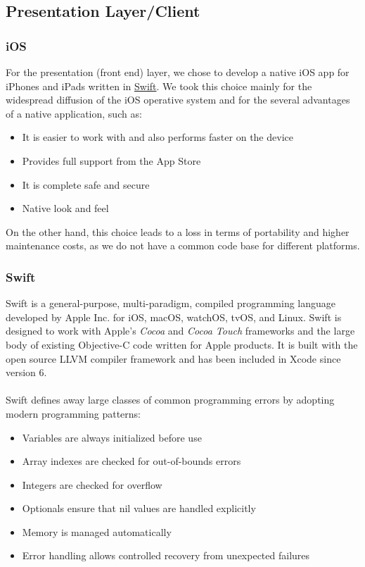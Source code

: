 \subsection{Presentation Layer/Client}

\subsubsection{iOS}
For the presentation (front end) layer, we chose to develop a native iOS app for iPhones and iPads written in \href{https://developer.apple.com/swift/}{Swift}. 
We took this choice mainly for the widespread diffusion of the iOS operative system and for the several advantages of a native application, such as:
\begin{itemize}
	\item It is easier to work with and also performs faster on the device
	\item Provides full support from the App Store
	\item It is complete safe and secure
	\item Native look and feel
\end{itemize}

On the other hand, this choice leads to a loss in terms of portability and higher maintenance costs, as we do not have a common code base for different platforms.

\subsubsection{Swift}
Swift is a general-purpose, multi-paradigm, compiled programming language developed by Apple Inc. for iOS, macOS, watchOS, tvOS, and Linux. Swift is designed to work with Apple's \textit{Cocoa} and \textit{Cocoa Touch} frameworks and the large body of existing Objective-C  code written for Apple products. It is built with the open source LLVM compiler framework and has been included in Xcode since version 6.
\\ \\
Swift defines away large classes of common programming errors by adopting modern programming patterns:

\begin{itemize}
\item Variables are always initialized before use
\item Array indexes are checked for out-of-bounds errors
\item Integers are checked for overflow
\item Optionals ensure that nil values are handled explicitly
\item Memory is managed automatically
\item Error handling allows controlled recovery from unexpected failures
\end{itemize}

